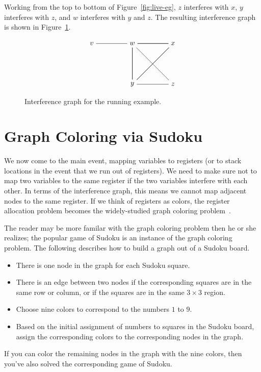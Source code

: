 \documentclass[12pt]{book}
\begin{document}
Working from the top to bottom of Figure~\ref{fig:live-eg}, $z$
interferes with $x$, $y$ interferes with $z$, and $w$ interferes with
$y$ and $z$.  The resulting interference graph is shown in
Figure~\ref{fig:interfere}.

\begin{figure}[tbp]
\large
\[
\begin{tikzpicture}[baseline=(current  bounding  box.center)]
\node (v) at (0,0)   {$v$};
\node (w) at (2,0)   {$w$};
\node (x) at (4,0)   {$x$};
\node (y) at (2,-2)  {$y$};
\node (z) at (4,-2)  {$z$};

\draw (v) to (w);
\foreach \i in {w,x,y} 
{
  \foreach \j in {w,x,y}
  { 
    \draw (\i) to (\j);
  }
}
\draw (z) to (w);
\draw (z) to (y);
\end{tikzpicture}
\]
\caption{Interference graph for the running example.}
\label{fig:interfere}
\end{figure}


\section{Graph Coloring via Sudoku}

We now come to the main event, mapping variables to registers (or to
stack locations in the event that we run out of registers).  We need
to make sure not to map two variables to the same register if the two
variables interfere with each other.  In terms of the interference
graph, this means we cannot map adjacent nodes to the same register.
If we think of registers as colors, the register allocation problem
becomes the widely-studied graph coloring
problem~\citep{Balakrishnan:1996ve,Rosen:2002bh}.  

The reader may be more familar with the graph coloring problem then he
or she realizes; the popular game of Sudoku is an instance of the
graph coloring problem. The following describes how to build a graph
out of a Sudoku board.
\begin{itemize}
\item There is one node in the graph for each Sudoku square.
\item There is an edge between two nodes if the corresponding squares
  are in the same row or column, or if the squares are in the same
  $3\times 3$ region.
\item Choose nine colors to correspond to the numbers $1$ to $9$.
\item Based on the initial assignment of numbers to squares in the
  Sudoku board, assign the corresponding colors to the corresponding
  nodes in the graph.
\end{itemize}
If you can color the remaining nodes in the graph with the nine
colors, then you've also solved the corresponding game of Sudoku.
\end{document}
